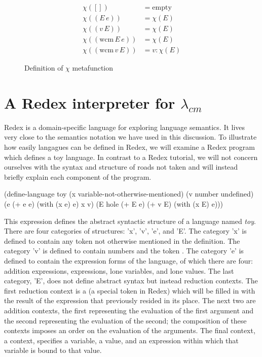 \documentclass[ms,electronic,twosidetoc,letterpaper,chaptercenter,parttop]{byumsphd}
\begin{document}
\begin{figure}
\begin{align*}
\chi([])                   &= \mathrm{empty}\\
\chi((E\,e))               &= \chi(E)\\
\chi((v\,E))               &= \chi(E)\\
\chi((\mathrm{wcm}\,E\,e)) &= \chi(E)\\
\chi((\mathrm{wcm}\,v\,E)) &= v : \chi(E)
\end{align*}
\caption{Definition of $\chi$ metafunction}
\label{chi-metafunction}
\end{figure}

\section{A Redex interpreter for $\lambda_{cm}$}

Redex \cite{findler2010redex} is a domain-specific language for exploring language
semantics. It lives very close to the semantics notation we have used in this discussion.
To illustrate how easily langagues can be defined in Redex, we will examine a Redex
program which defines a toy language. In contrast to a Redex tutorial, we will not concern
ourselves with the syntax and structure of roads not taken and will instead briefly
explain each component of the program.

\begin{schemedisplay}
(define-language toy
  (x variable-not-otherwise-mentioned)
  (v number undefined) 
  (e (+ e e) (with (x e) e) x v)
  (E hole (+ E e) (+ v E) (with (x E) e)))
\end{schemedisplay}

This expression defines the abstract syntactic structure of a language named \emph{toy}.
There are four categories of structures: \scheme'x', \scheme'v', \scheme'e', and 
\scheme'E'. The category \scheme'x' is defined to contain any token not otherwise 
mentioned in the definition. The category \scheme'v' is defined to contain numbers and 
the token . The category \scheme'e' is defined to contain the expression 
forms of the language, of which there are four: addition expressions,  
expressions, lone variables, and lone values. The last category, \scheme'E', does not 
define abstract syntax but instead reduction contexts. The first reduction context is a 
 (a special token in Redex) which will be filled in with the result of the 
expression that previously resided in its place. The next two are addition contexts, the 
first representing the evaluation of the first argument and the second representing the 
evaluation of the second; the composition of these contexts imposes an order on the 
evaluation of the arguments. The final context, a  context, specifies a 
variable, a value, and an expression within which that variable is bound to that value.
\end{document}

